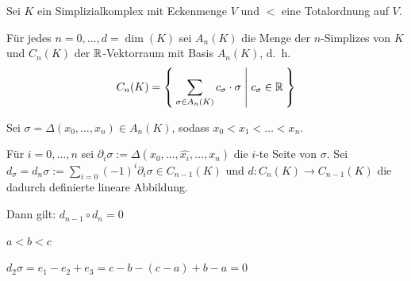 \begin{korollar}
    Sei $K$ ein  Simplizialkomplex mit Eckenmenge $V$
    und $<$ eine Totalordnung auf $V$.

    Für jedes $n=0, \dots, d=\dim(K)$ sei $A_n(K)$ die Menge der
    $n$-Simplizes von $K$ und $C_n(K)$ der $\mathbb{R}$-Vektorraum mit
    Basis $A_n(K)$, d.~h.
    \[C_n(K) = \Set{\sum_{\sigma \in A_n(K)} c_\sigma \cdot \sigma | c_\sigma \in \ensuremath{\mathbb{R}}}\]

    Sei $\sigma = \Delta(x_0, \dots, x_n) \in A_n(K)$, sodass 
    $x_0 < x_1 < \dots < x_n$.

    Für $i = 0, \dots, n$ sei $\partial_i \sigma := \Delta(x_0, \dots, \hat{x_i}, \dots, x_n)$
    die $i$-te Seite von $\sigma$. Sei $d_\sigma = d_n \sigma := \sum_{i=0} (-1)^i \partial_i \sigma \in C_{n-1} (K)$
    und $d: C_n(K) \rightarrow C_{n-1}(K)$ die dadurch definierte lineare
    Abbildung.

    Dann gilt: $d_{n-1} \circ d_n = 0$

    

    $a < b < c$

    $d_2 \sigma = e_1 - e_2 + e_3 = c - b - (c-a) + b - a = 0$
\end{korollar}


